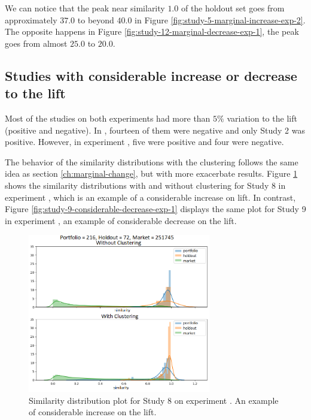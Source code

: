 We can notice that the peak near similarity $1.0$ of the holdout set goes from approximately $37.0$ to beyond $40.0$ in Figure \ref{fig:study-5-marginal-increase-exp-2}. The opposite happens in Figure \ref{fig:study-12-marginal-decrease-exp-1}, the peak goes from almost $25.0$ to $20.0$.

\subsection{Studies with considerable increase or decrease to the lift}
\label{ch:considerable-change}

Most of the studies on both experiments had more than $5\%$ variation to the lift (positive and negative). In \nameExperimentI{}, fourteen of them were negative and only Study 2 was positive. However, in experiment \nameExperimentII{}, five were positive and four were negative.

The behavior of the similarity distributions with the clustering follows the same idea as section \ref{ch:marginal-change}, but with more exacerbate results. Figure \ref{fig:study-8-considerable-increase-exp-2} shows the similarity distributions with and without clustering for Study 8 in experiment \nameExperimentII{}, which is an example of a considerable increase on lift. In contrast, Figure \ref{fig:study-9-considerable-decrease-exp-1} displays the same plot for Study 9 in experiment \nameExperimentI{}, an example of considerable decrease on the lift.

\begin{figure}[!ht]
   \centering
   \includegraphics[width=8cm]{fig/ch4-study-8-considerable-increase-exp-2.png}
   \caption{Similarity distribution plot for Study 8 on experiment \nameExperimentII{}. An example of considerable increase on the lift.}
   \label{fig:study-8-considerable-increase-exp-2}
\end{figure}

